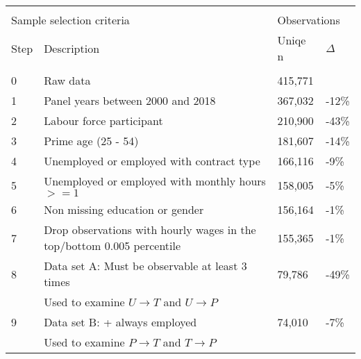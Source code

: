 \begin{tabular}{llll}
   \hline\hline \\[-1.8ex] 
 \multicolumn{2}{l}{Sample selection criteria} & \multicolumn{2}{l}{Observations} \\  \cmidrule(lr){3-4} 
 
                     Step     &  Description     & Uniqe n  & $\Delta$ \\ 

                     \cmidrule(lr){1-1} \cmidrule(lr){2-2} \cmidrule(lr){3-3} \cmidrule(lr){4-4} \\[-1.8ex] 
0 & Raw data & 415,771 &  \\ 
  1 & Panel years between 2000 and 2018 & 367,032 & -12\% \\ 
  2 & Labour force participant & 210,900 & -43\% \\ 
  3 & Prime age (25 - 54) & 181,607 & -14\% \\ 
  4 & Unemployed or employed with contract type & 166,116 & -9\% \\ 
  5 & Unemployed or employed with monthly hours $>= 1$ & 158,005 & -5\% \\ 
  6 & Non missing education or gender & 156,164 & -1\% \\ 
  7 & Drop observations with hourly wages in the top/bottom 0.005 percentile & 155,365 & -1\% \\ 
  8 & Data set A: Must be observable at least 3 times & 79,786 & -49\% \\ 
   &  \multicolumn{3}{l}{\hspace{5mm}Used to examine $U \rightarrow T$ and $U \rightarrow P$} \\ 
9 & Data set B: + always employed & 74,010 & -7\% \\ 
   &  \multicolumn{3}{l}{\hspace{5mm}Used to examine $P \rightarrow T$ and $T \rightarrow P$} \\ 
 \hline 
\end{tabular}
